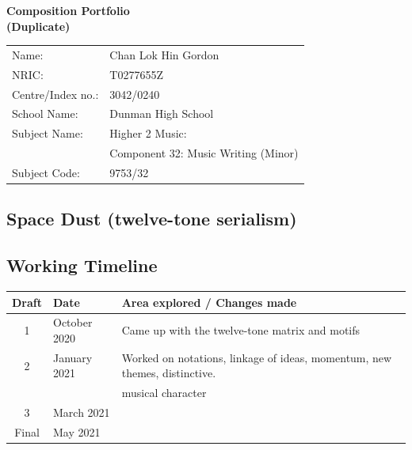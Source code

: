 \documentclass{article}
\begin{document}
\begin{center}
\vspace*{\fill}
\LARGE
    {\bf Composition Portfolio\\
    (Duplicate)}
\vspace*{\fill}
%
\end{center}
\begin{center}
    \large
\begin{tabular}{ll}
    Name: &Chan Lok Hin Gordon\\
    NRIC: &T0277655Z\\
    Centre/Index no.: &3042/0240\\
    School Name: &Dunman High School\\
    Subject Name: &Higher 2 Music:\\
    &Component 32: Music Writing (Minor)\\
    Subject Code: &9753/32
\end{tabular}
\end{center}

\newpage

\tableofcontents

\newpage

\begin{center}
\vspace*{\fill}
\LARGE
    \section{Space Dust (twelve-tone serialism)}
\vspace*{\fill}
%
\end{center}

\newpage

\subsection{Working Timeline}
\begin{center}
	\def\arraystretch{1.5}
\begin{tabular}{|c|l|l|}
	\hline
	Draft&Date&Area explored / Changes made\\
	\hline
	1&October 2020&
    Came up with the twelve-tone matrix and motifs\\
	\hline
	2&January 2021&
    Worked on notations, linkage of ideas, momentum, new themes, distinctive.\\
    &&musical character\\
	\hline
	3&March 2021&\\
	\hline
	Final&May 2021&\\
	\hline
\end{tabular}
\end{center}
\end{document}
